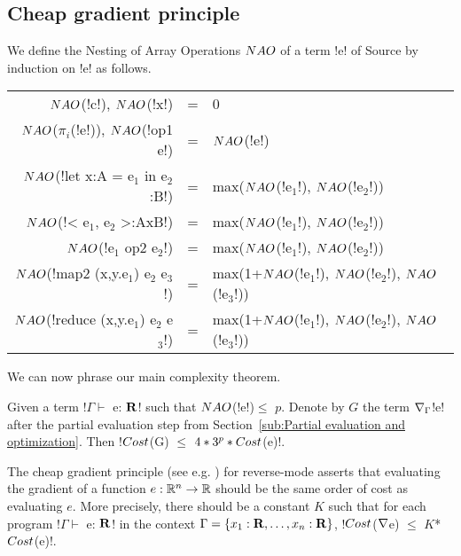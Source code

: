 

\subsection{Cheap gradient principle}

We define the Nesting of Array Operations $NAO$ of a term !e! of Source by induction on !e! as follows.

\begin{center}
\begin{tabular}{r c l}
    $NAO$(!c!), $NAO$(!x!) &=& 0 \\
    $NAO$($\pi_i$(!e!)), $NAO$(!op1 e!) &=& $NAO$(!e!) \\
    $NAO$(!let x:A = e$_1$ in e$_2$:B!) &=& max($NAO$(!e$_1$!), $NAO$(!e$_2$!))  \\ 
    $NAO$(!< e$_1$, e$_2$ >:AxB!) &=& max($NAO$(!e$_1$!), $NAO$(!e$_2$!)) \\ 
    $NAO$(!e$_1$ op2 e$_2$!) &=& max($NAO$(!e$_1$!), $NAO$(!e$_2$!))\\
    $NAO$(!map2 (x,y.e$_1$) e$_2$ e$_3$!) &=& max(1+$NAO$(!e$_1$!), $NAO$(!e$_2$!), $NAO$(!e$_3$!)) \\
    $NAO$(!reduce (x,y.e$_1$) e$_2$ e$_3$!) &=& max(1+$NAO$(!e$_1$!), $NAO$(!e$_2$!), $NAO$(!e$_3$!))
\end{tabular}
\end{center}

We can now phrase our main complexity theorem.

\begin{theorem}
    \label{thm:complexity}
    Given a term !$\Gamma \vdash$ e: $\mathbf{R}$! such that $NAO$(!e!)$\leq$ $p$.
    Denote by $G$ the term $\nabla_\Gamma$!e! after the partial evaluation step from Section~\ref{sub:Partial evaluation and optimization}.
    Then !$Cost$(G) $\leq$ $4*3^{p}*Cost$(e)!.
\end{theorem}

The cheap gradient principle (see e.g. \cite{griewank2008evaluating}) for reverse-mode
asserts that evaluating the gradient of a function $e:\mathbb{R}^n\to\mathbb{R}$ 
should be the same order of cost as evaluating $e$. 
More precisely, there should be a constant $K$ such that for each program !$\Gamma \vdash$ e: $\mathbf{R}$! in the context $\Gamma=\{x_1:\mathbf{R},\ldots,x_n:\mathbf{R}\}$,
!$Cost$($\nabla$e) $\leq$ $K$*$Cost$(e)!.

